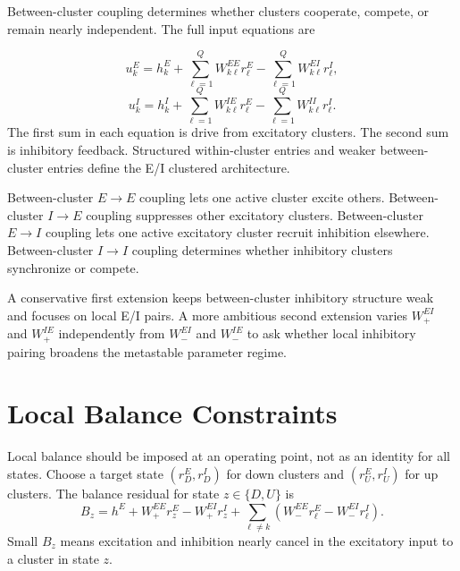 Between-cluster coupling determines whether clusters cooperate, compete, or remain nearly independent. The full input equations are
%
\begin{keyequation}
\begin{equation}
  u_k^E
  =
  h_k^E
  +
  \sum_{\ell=1}^{Q}W_{k\ell}^{EE}r_{\ell}^{E}
  -
  \sum_{\ell=1}^{Q}W_{k\ell}^{EI}r_{\ell}^{I},
  \label{eq:full-e-input-ei-extension}
\end{equation}
\begin{equation}
  u_k^I
  =
  h_k^I
  +
  \sum_{\ell=1}^{Q}W_{k\ell}^{IE}r_{\ell}^{E}
  -
  \sum_{\ell=1}^{Q}W_{k\ell}^{II}r_{\ell}^{I}.
  \label{eq:full-i-input-ei-extension}
\end{equation}
\tcblower
The first sum in each equation is drive from excitatory clusters. The second sum is inhibitory feedback. Structured within-cluster entries and weaker between-cluster entries define the E/I clustered architecture.
\end{keyequation}

\noindent Between-cluster $E\to E$ coupling lets one active cluster excite others. Between-cluster $I\to E$ coupling suppresses other excitatory clusters. Between-cluster $E\to I$ coupling lets one active excitatory cluster recruit inhibition elsewhere. Between-cluster $I\to I$ coupling determines whether inhibitory clusters synchronize or compete.

A conservative first extension keeps between-cluster inhibitory structure weak and focuses on local E/I pairs. A more ambitious second extension varies $W_{+}^{EI}$ and $W_{+}^{IE}$ independently from $W_{-}^{EI}$ and $W_{-}^{IE}$ to ask whether local inhibitory pairing broadens the metastable parameter regime.

\section{Local Balance Constraints}
\label{sec:local-balance-constraints}

Local balance should be imposed at an operating point, not as an identity for all states. Choose a target state $(r_{D}^{E},r_{D}^{I})$ for down clusters and $(r_{U}^{E},r_{U}^{I})$ for up clusters. The balance residual for state $z\in\{D,U\}$ is
%
\begin{equation}
  B_z
  =
  h^E
  +
  W_{+}^{EE}r_z^E
  -
  W_{+}^{EI}r_z^I
  +
  \sum_{\ell\ne k}
  \left(
    W_{-}^{EE}r_{\ell}^{E}
    -
    W_{-}^{EI}r_{\ell}^{I}
  \right).
  \label{eq:balance-residual-state}
\end{equation}
%
Small $B_z$ means excitation and inhibition nearly cancel in the excitatory input to a cluster in state $z$.

